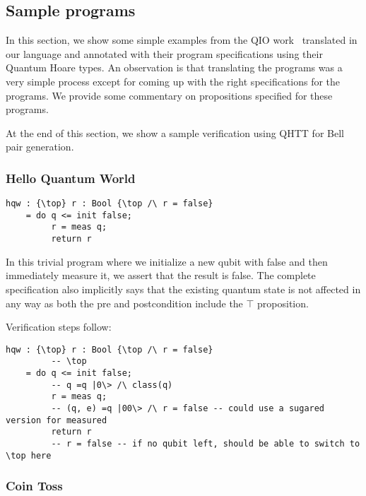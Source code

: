 \documentclass[acmsmall,nonacm,timestamp,review=false,anonymous=false]{acmart}
\begin{document}
\subsection{Sample programs}
\label{sec:examples}

In this section, we show some simple examples from the QIO work~\cite{qio} translated in our language and annotated with their program specifications using their Quantum Hoare types. An observation is that translating the programs was a very simple process except for coming up with the right specifications for the programs. We provide some commentary on propositions specified for these programs.

At the end of this section, we show a sample verification using QHTT for Bell pair generation.

\subsubsection{Hello Quantum World}
\leavevmode

\begin{minipage}{0.95\linewidth}
\begin{lstlisting}[language=QHaskell]
hqw : {\top} r : Bool {\top /\ r = false}
    = do q <= init false;
         r = meas q;
         return r
\end{lstlisting}
\end{minipage}

In this trivial program where we initialize a new qubit with false and then immediately measure it, we assert that the result is false. The complete specification also implicitly says that the existing quantum state is not affected in any way as both the pre and postcondition include the $\top$ proposition.

Verification steps follow:

\begin{minipage}{0.95\linewidth}
\begin{lstlisting}[language=QHaskell]
hqw : {\top} r : Bool {\top /\ r = false}
         -- \top
    = do q <= init false;
         -- q =q |0\> /\ class(q)
         r = meas q;
         -- (q, e) =q |00\> /\ r = false -- could use a sugared version for measured
         return r
         -- r = false -- if no qubit left, should be able to switch to \top here
\end{lstlisting}
\end{minipage}

\subsubsection{Coin Toss}
\leavevmode
\end{document}
